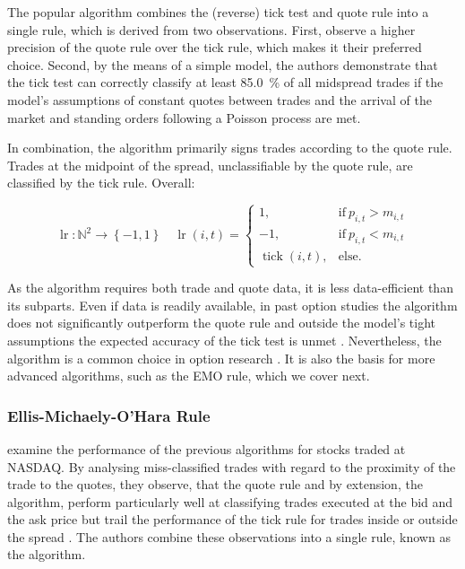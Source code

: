 The popular  algorithm \autocite[][745]{leeInferringTradeDirection1991} combines the (reverse) tick test and quote rule into a single rule, which is derived from two observations. First, \textcite[][735--743]{leeInferringTradeDirection1991} observe a higher precision of the quote rule over the tick rule, which makes it their preferred choice. Second, by the means of a simple model, the authors demonstrate that the tick test can correctly classify at least \SI{85.0}{\percent} of all midspread trades if the model's assumptions of constant quotes between trades and the arrival of the market and standing orders following a Poisson process are met.

In combination, the algorithm primarily signs trades according to the quote rule. Trades at the midpoint of the spread, unclassifiable by the quote rule, are classified by the tick rule. Overall:

\begin{equation}
\operatorname{lr} \colon \mathbb{N}^2 \to \left\{-1, 1\right\}\quad\operatorname{lr}(i,t)=
\begin{cases}
1, & \text{if}\ p_{i, t} > m_{i, t} \\
-1,  & \text{if}\ p_{i, t} < m_{i, t} \\
\operatorname{tick}(i, t), & \text{else}.
\end{cases}
\end{equation}

As the algorithm requires both trade and quote data, it is less data-efficient than its subparts. Even if data is readily available, in past option studies the algorithm does not significantly outperform the quote rule and outside the model's tight assumptions the expected accuracy of the tick test is unmet \autocites[][30--32]{grauerOptionTradeClassification2022}[][886]{savickasInferringDirectionOption2003}. Nevertheless, the algorithm is a common choice in option research \autocite[cp.][453]{easleyOptionVolumeStock1998}. It is also the basis for more advanced algorithms, such as the \gls{EMO} rule, which we cover next.

\subsubsection{Ellis-Michaely-O'Hara
Rule}\label{sec:ellis-michaely-ohara-rule}

\textcite[][536]{ellisAccuracyTradeClassification2000} examine the performance of the previous algorithms for stocks traded at \gls{NASDAQ}. By analysing miss-classified trades with regard to the proximity of the trade to the quotes, they observe, that the quote rule and by extension, the  algorithm, perform particularly well at classifying trades executed at the bid and the ask price but trail the performance of the tick rule for trades inside or outside the spread \autocite[][535--536]{ellisAccuracyTradeClassification2000}. The authors combine these observations into a single rule, known as the  algorithm.

